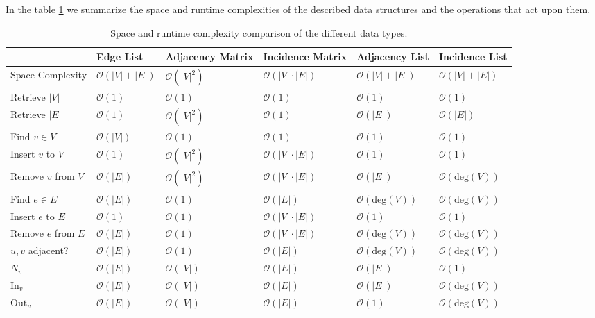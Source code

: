         In the table \ref{sumtabds} we summarize the space and runtime complexities of the described data structures and the operations that act upon them. 
        
        \begin{table}
            \begin{tabular}[c]{p{3cm} p{2cm} p{2cm} p{2cm} p{2cm} p{2cm}} \toprule
            & Edge List & Adjacency Matrix & Incidence Matrix & Adjacency List & Incidence List \\ \midrule
            Space Complexity & $\mathcal{O}(|V| + |E|)$ & $\mathcal{O}(|V|^2)$ & $\mathcal{O}(|V| \cdot |E|)$ & $\mathcal{O}(|V| + |E|)$ & $\mathcal{O}(|V| + |E|)$ \\
            Retrieve $|V|$ & $\mathcal{O}(1)$ & $\mathcal{O}(1)$ & $\mathcal{O}(1)$ & $\mathcal{O}(1)$ & $\mathcal{O}(1)$ \\
            Retrieve $|E|$ & $\mathcal{O}(1)$ & $\mathcal{O}(|V|^2)$ & $\mathcal{O}(1)$ & $\mathcal{O}(|E|)$ & $\mathcal{O}(|E|)$ \\
            Find $v \in V$ & $\mathcal{O}(|V|)$ & $\mathcal{O}(1)$ & $\mathcal{O}(1)$ & $\mathcal{O}(1)$ & $\mathcal{O}(1)$ \\
            Insert $v$ to $V$ & $\mathcal{O}(1)$ & $\mathcal{O}(|V|^2)$ & $\mathcal{O}(|V| \cdot |E|)$ & $\mathcal{O}(1)$ & $\mathcal{O}(1)$ \\
            Remove $v$ from $V$ & $\mathcal{O}(|E|)$ & $\mathcal{O}(|V|^2)$ & $\mathcal{O}(|V| \cdot |E|)$ & $\mathcal{O}(|E|)$ & $\mathcal{O}(\text{deg}(V))$ \\
            Find $e \in E$ & $\mathcal{O}(|E|)$ & $\mathcal{O}(1)$ & $\mathcal{O}(|E|)$ & $\mathcal{O}(\text{deg}(V))$ & $\mathcal{O}(\text{deg}(V))$ \\
            Insert $e$ to $E$ & $\mathcal{O}(1)$ & $\mathcal{O}(1)$ & $\mathcal{O}(|V| \cdot |E|)$ & $\mathcal{O}(1)$ & $\mathcal{O}(1)$ \\
            Remove $e$ from $E$ & $\mathcal{O}(|E|)$ & $\mathcal{O}(1)$ & $\mathcal{O}(|V| \cdot |E|)$ & $\mathcal{O}(\text{deg}(V))$ & $\mathcal{O}(\text{deg}(V))$ \\
            $u, v$ adjacent? & $\mathcal{O}(|E|)$ & $\mathcal{O}(1)$ & $\mathcal{O}(|E|)$ & $\mathcal{O}(\text{deg}(V))$ & $\mathcal{O}(\text{deg}(V))$ \\
            $N_v$ & $\mathcal{O}(|E|)$ & $\mathcal{O}(|V|)$ & $\mathcal{O}(|E|)$ & $\mathcal{O}(|E|)$ & $\mathcal{O}(1)$ \\
            $\text{In}_v$ & $\mathcal{O}(|E|)$ & $\mathcal{O}(|V|)$ & $\mathcal{O}(|E|)$ & $\mathcal{O}(|E|)$ & $\mathcal{O}(\text{deg}(V))$ \\
            $\text{Out}_v$ & $\mathcal{O}(|E|)$ & $\mathcal{O}(|V|)$ & $\mathcal{O}(|E|)$ & $\mathcal{O}(1)$ & $\mathcal{O}(\text{deg}(V))$ \\ \bottomrule
         \end{tabular}
         \caption{Space and runtime complexity comparison of the different data types.}
        \label{sumtabds}
        \end{table}

